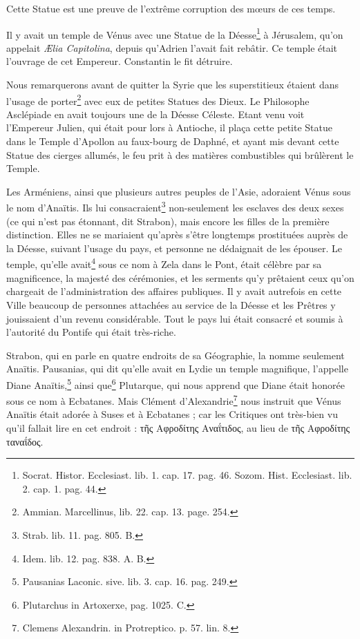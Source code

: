 \documentclass[a4paper, 18pt, oneside]{article}
\begin{document}
Cette Statue est une preuve de l'extrême corruption des mœurs de ces temps.

Il y avait un temple de Vénus avec une Statue de la Déesse\footnote{Socrat. Histor. Ecclesiast. lib. 1. cap. 17. pag. 46. Sozom. Hist. Ecclesiast. lib. 2. cap. 1. pag. 44.} à Jérusalem, qu'on appelait \emph{Ælia Capitolina}, depuis qu'Adrien l'avait fait rebâtir. Ce temple était l'ouvrage de cet Empereur. Constantin le fit détruire.

Nous remarquerons avant de quitter la Syrie que les superstitieux étaient dans l'usage de porter\footnote{Ammian. Marcellinus, lib. 22. cap. 13. page. 254.} avec eux de petites Statues des Dieux. Le Philosophe Asclépiade en avait toujours une de la Déesse Céleste. Etant venu voit l'Empereur Julien, qui était pour lors à Antioche, il plaça cette petite Statue dans le Temple d'Apollon au faux-bourg de Daphné, et ayant mis devant cette Statue des cierges allumés, le feu prit à des matières combustibles qui brûlèrent le Temple.

Les Arméniens, ainsi que plusieurs autres peuples de l'Asie, adoraient Vénus sous le nom d'Anaïtis. Ils lui consacraient\footnote{Strab. lib. 11. pag. 805. B.} non-seulement les esclaves des deux sexes (ce qui n'est pas étonnant, dit Strabon), mais encore les filles de la première distinction. Elles ne se mariaient qu'après s'être longtemps prostituées auprès de la Déesse, suivant l'usage du pays, et personne ne dédaignait de les épouser. Le temple, qu'elle avait\footnote{Idem. lib. 12. pag. 838. A. B.} sous ce nom à Zela dans le Pont, était célèbre par sa magnificence, la majesté des cérémonies, et les serments qu'y prêtaient ceux qu'on chargeait de l'administration des affaires publiques. Il y avait autrefois en cette Ville beaucoup de personnes attachées au service de la Déesse et les Prêtres y jouissaient d'un revenu considérable. Tout le pays lui était consacré et soumis à l'autorité du Pontife qui était très-riche.

Strabon, qui en parle en quatre endroits de sa Géographie, la nomme seulement Anaïtis. Pausanias, qui dit qu'elle avait en Lydie un temple magnifique, l'appelle Diane Anaïtis,\footnote{Pausanias Laconic. sive. lib. 3. cap. 16. pag. 249.} ainsi que\footnote{Plutarchus in Artoxerxe, pag. 1025. C.} Plutarque, qui nous apprend que Diane était honorée sous ce nom à Ecbatanes. Mais Clément d'Alexandrie\footnote{Clemens Alexandrin. in Protreptico. p. 57. lin. 8.} nous instruit que Vénus Anaïtis était adorée à Suses et à Ecbatanes ; car les Critiques ont très-bien vu qu'il fallait lire en cet endroit : τῆς Αφροδίτης Αναΐτιδος, au lieu de τῆς Αφροδίτης ταναΐδος.
\end{document}
